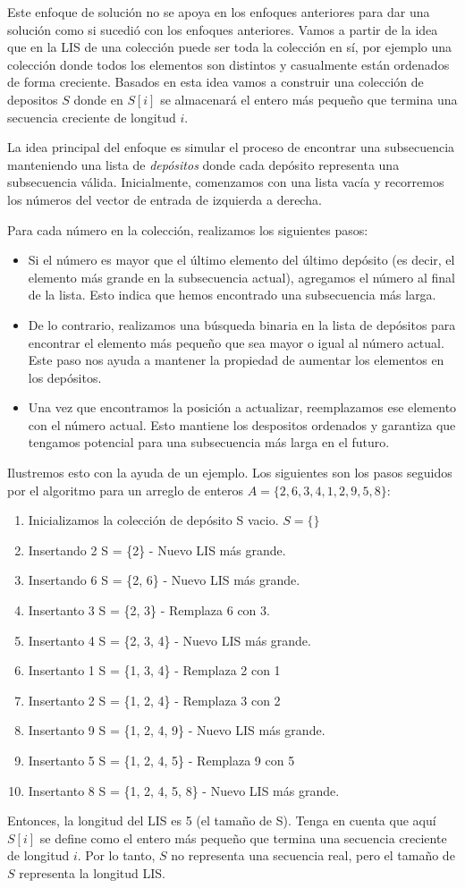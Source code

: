 Este enfoque de solución no se apoya en los enfoques anteriores para dar una solución como si sucedió con los enfoques anteriores. Vamos a partir de la idea que en la LIS de una colección puede ser toda la colección en sí, por ejemplo una colección donde todos los elementos son distintos y casualmente están ordenados de forma creciente. Basados en esta idea vamos a construir una colección de depositos $S$ donde en $S[i]$ se almacenará el entero más pequeño que termina una secuencia creciente de longitud $i$. 

La idea principal del enfoque es simular el proceso de encontrar una subsecuencia manteniendo una lista de \emph{depósitos} donde cada depósito representa una subsecuencia válida. Inicialmente, comenzamos con una lista vacía y recorremos los números del vector de entrada de izquierda a derecha.

Para cada número en la colección, realizamos los siguientes pasos:

\begin{itemize}
	\item Si el número es mayor que el último elemento del último depósito (es decir, el elemento más grande en la subsecuencia actual), agregamos el número al final de la lista. Esto indica que hemos encontrado una subsecuencia más larga.
	\item De lo contrario, realizamos una búsqueda binaria en la lista de depósitos para encontrar el elemento más pequeño que sea mayor o igual al número actual. Este paso nos ayuda a mantener la propiedad de aumentar los elementos en los depósitos.
	\item Una vez que encontramos la posición a actualizar, reemplazamos ese elemento con el número actual. Esto mantiene los despositos ordenados y garantiza que tengamos potencial para una subsecuencia más larga en el futuro.
\end{itemize}

Ilustremos esto con la ayuda de un ejemplo. Los siguientes son los pasos seguidos por el algoritmo para un arreglo de enteros $A=\{2, 6, 3, 4, 1, 2, 9, 5, 8\}$:

\begin{enumerate}
	\item Inicializamos la colección de depósito S vacio. $S= \{\}$
	\item Insertando 2  S = \{2\} - Nuevo LIS más grande.
	\item Insertando 6  S = \{2, 6\} - Nuevo LIS más grande.
	\item Insertanto 3  S = \{2, 3\} - Remplaza 6 con 3.
	\item Insertanto 4  S = \{2, 3, 4\} - Nuevo LIS más grande.
	\item Insertanto 1  S = \{1, 3, 4\} - Remplaza 2 con 1
	\item Insertanto 2  S = \{1, 2, 4\} - Remplaza 3 con 2
	\item Insertanto 9  S = \{1, 2, 4, 9\} - Nuevo LIS más grande.
	\item Insertanto 5  S = \{1, 2, 4, 5\} - Remplaza 9 con 5
	\item Insertanto 8  S = \{1, 2, 4, 5, 8\} - Nuevo LIS más grande.
\end{enumerate}

Entonces, la longitud del LIS es 5 (el tamaño de S). Tenga en cuenta que aquí $S[i]$ se define como el entero más pequeño que termina una secuencia creciente de longitud $i$. Por lo tanto, $S$ no representa una secuencia real, pero el tamaño de $S$ representa la longitud LIS.